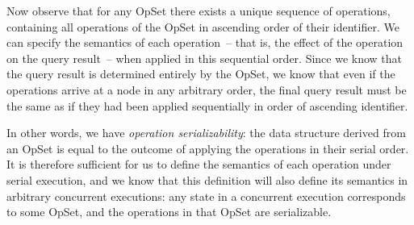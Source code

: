 Now observe that for any OpSet there exists a unique sequence of operations, containing all operations of the OpSet in ascending order of their identifier.
We can specify the semantics of each operation~-- that is, the effect of the operation on the query result~-- when applied in this sequential order.
Since we know that the query result is determined entirely by the OpSet, we know that even if the operations arrive at a node in any arbitrary order, the final query result must be the same as if they had been applied sequentially in order of ascending identifier.

In other words, we have \emph{operation serializability}: the data structure derived from an OpSet is equal to the outcome of applying the operations in their serial order.
It is therefore sufficient for us to define the semantics of each operation under serial execution, and we know that this definition will also define its semantics in arbitrary concurrent executions: any state in a concurrent execution corresponds to some OpSet, and the operations in that OpSet are serializable.
